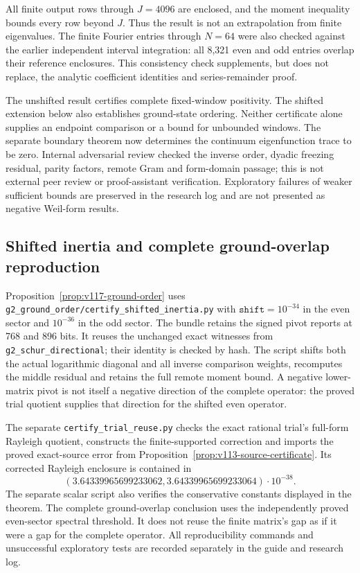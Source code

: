 \documentclass[11pt]{article}
\theoremstyle{remark}
\begin{document}
All finite output rows through $J=4096$ are enclosed, and the moment
inequality bounds every row beyond $J$. Thus the result is not an
extrapolation from finite eigenvalues. The finite Fourier entries through
$N=64$ were also checked against the earlier independent interval
integration: all 8,321 even and odd entries overlap their reference
enclosures. This consistency check supplements, but does not replace,
the analytic coefficient identities and series-remainder proof.

The unshifted result certifies complete fixed-window positivity.
The shifted extension below also establishes ground-state ordering.
Neither certificate alone supplies an endpoint comparison or a bound
for unbounded windows. The separate boundary theorem now determines
the continuum eigenfunction trace to be zero. Internal adversarial review checked the inverse order, dyadic
freezing residual, parity factors, remote Gram and form-domain passage;
this is not external peer review or proof-assistant verification.
Exploratory failures of weaker sufficient bounds are preserved in the
research log and are not presented as negative Weil-form results.

\subsection*{Shifted inertia and complete ground-overlap reproduction}
Proposition~\ref{prop:v117-ground-order} uses
\texttt{g2\_ground\_order/certify\_shifted\_inertia.py} with
$\texttt{shift}=10^{-34}$ in the even sector and $10^{-36}$ in the
odd sector. The bundle retains the signed pivot reports at 768 and
896 bits. It reuses the unchanged exact witnesses from
\texttt{g2\_schur\_directional}; their identity is checked by hash.
The script shifts both the actual logarithmic diagonal and all inverse
comparison weights, recomputes the middle residual and retains the
full remote moment bound. A negative lower-matrix pivot is not itself
a negative direction of the complete operator: the proved trial quotient
supplies that direction for the shifted even operator.

The separate \texttt{certify\_trial\_reuse.py} checks the exact rational
trial's full-form Rayleigh quotient, constructs the finite-supported
correction and imports the proved exact-source error from
Proposition~\ref{prop:v113-source-certificate}. Its corrected Rayleigh
enclosure is contained in
\[
 (3.64339965699233062,3.64339965699233064)\cdot10^{-38}.
\]
The separate scalar script also verifies the conservative constants
displayed in the theorem.
The complete ground-overlap conclusion uses the independently proved
even-sector spectral threshold. It does not reuse the finite matrix's
gap as if it were a gap for the complete operator.
All reproducibility commands and unsuccessful exploratory tests are
recorded separately in the guide and research log.
\end{document}
